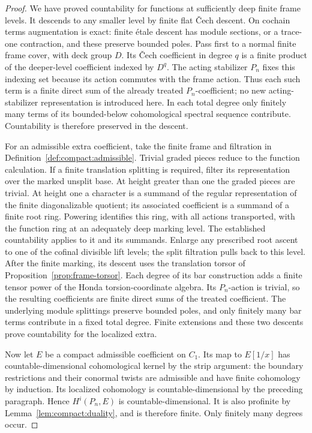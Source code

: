 \begin{proof}
We have proved countability for functions at sufficiently deep finite
frame levels.  It descends to any smaller level by finite flat
\v{C}ech descent.  On cochain terms augmentation is exact: finite
\'{e}tale descent has module sections, or a trace-one contraction,
and these preserve bounded poles.  Pass first to a normal finite frame cover, with deck group $D$.
Its \v{C}ech coefficient in degree $q$ is a finite product of the
deeper-level coefficient indexed by $D^q$.  The acting stabilizer
$P_n$ fixes this indexing set because its action commutes with
the frame action.  Thus each such term is a finite direct sum
of the already treated $P_n$-coefficient; no new acting-stabilizer
representation is introduced here.  In each total degree only finitely
many terms of its bounded-below cohomological spectral sequence
contribute.  Countability is therefore preserved in the descent.

For an admissible extra coefficient, take the finite frame and
filtration in Definition~\ref{def:compact:admissible}.  Trivial
graded pieces reduce to the function calculation.  If a finite
translation splitting is required, filter its representation over
the marked unsplit base.  At height greater than one the graded
pieces are trivial.  At height one a character is a summand of the
regular representation of the finite diagonalizable quotient; its
associated coefficient is a summand of a finite root ring.  Powering
identifies this ring, with all actions transported, with the function
ring at an adequately deep marking level. The established
countability applies to it and its summands. Enlarge any prescribed
root ascent to one of the cofinal divisible lift levels; the split
filtration pulls back to this level. After the finite marking, its
descent uses the translation torsor of Proposition~\ref{prop:frame-torsor}.
Each degree of its bar construction adds a
finite tensor power of the Honda torsion-coordinate algebra. Its
$P_n$-action is trivial, so the resulting coefficients are finite
direct sums of the treated coefficient. The underlying module
splittings preserve bounded poles, and only finitely many bar terms
contribute in a fixed total degree. Finite extensions and these two
descents prove countability for the localized extra.

Now let $E$ be a compact admissible coefficient on $C_1$.
Its map to $E[1/x]$ has countable-dimensional cohomological kernel by
the strip argument: the boundary restrictions and their conormal
twists are admissible and have finite cohomology by induction.
Its localized cohomology is countable-dimensional by the preceding
paragraph.  Hence $H^i(P_n,E)$ is countable-dimensional.  It is also
profinite by Lemma~\ref{lem:compact:duality}, and is therefore finite.
Only finitely many degrees occur.


\end{proof}
